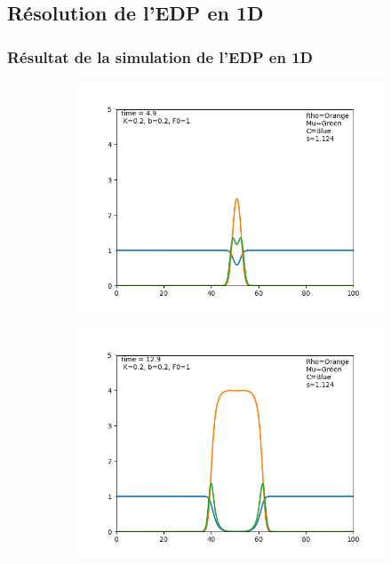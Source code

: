 \subsection{Résolution de l'EDP en 1D}
\subsubsection{Résultat de la simulation de l'EDP en 1D}
\begin{figure}[hbt!]
\centering
\begin{subfigure}[b]{0.45\textwidth}
\includegraphics[width=\textwidth]{Images/edp_1d_0.png}
\end{subfigure}
\begin{subfigure}[b]{0.45\textwidth}
\includegraphics[width=\textwidth]{Images/edp_1d_1.png}

\end{subfigure}
\end{figure}
